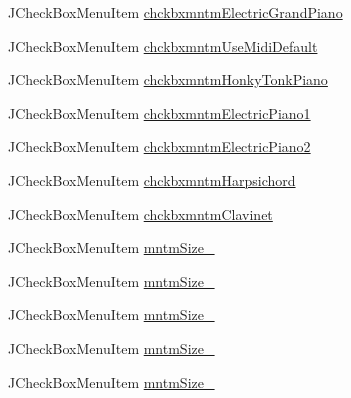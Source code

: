 \begin{DoxyCompactItemize}
\item 
J\+Check\+Box\+Menu\+Item \hyperlink{classcom_1_1lclion_1_1midigui_1_1_j_frame_m_i_d_i_piano_sheet_creator_ade34b598a3fb7ba9a61e9b2b7687ad9e}{chckbxmntm\+Electric\+Grand\+Piano}
\item 
J\+Check\+Box\+Menu\+Item \hyperlink{classcom_1_1lclion_1_1midigui_1_1_j_frame_m_i_d_i_piano_sheet_creator_ac9819205c38c3591401116984553387e}{chckbxmntm\+Use\+Midi\+Default}
\item 
J\+Check\+Box\+Menu\+Item \hyperlink{classcom_1_1lclion_1_1midigui_1_1_j_frame_m_i_d_i_piano_sheet_creator_ab59060cc1aaa1acf916f717203b8c8bd}{chckbxmntm\+Honky\+Tonk\+Piano}
\item 
J\+Check\+Box\+Menu\+Item \hyperlink{classcom_1_1lclion_1_1midigui_1_1_j_frame_m_i_d_i_piano_sheet_creator_a2a76124f85968992b142ad2d9fc78c73}{chckbxmntm\+Electric\+Piano1}
\item 
J\+Check\+Box\+Menu\+Item \hyperlink{classcom_1_1lclion_1_1midigui_1_1_j_frame_m_i_d_i_piano_sheet_creator_a64bf84906a571db4297425d89fd61dbd}{chckbxmntm\+Electric\+Piano2}
\item 
J\+Check\+Box\+Menu\+Item \hyperlink{classcom_1_1lclion_1_1midigui_1_1_j_frame_m_i_d_i_piano_sheet_creator_ad63305d8ca6fab38cf74a892d780461c}{chckbxmntm\+Harpsichord}
\item 
J\+Check\+Box\+Menu\+Item \hyperlink{classcom_1_1lclion_1_1midigui_1_1_j_frame_m_i_d_i_piano_sheet_creator_a1eba3e74979ed3e70114af6927e625a4}{chckbxmntm\+Clavinet}
\item 
J\+Check\+Box\+Menu\+Item \hyperlink{classcom_1_1lclion_1_1midigui_1_1_j_frame_m_i_d_i_piano_sheet_creator_ae16ca66c315ae28ba7b99aad21ad5e09}{mntm\+Size\+\_}
\item 
J\+Check\+Box\+Menu\+Item \hyperlink{classcom_1_1lclion_1_1midigui_1_1_j_frame_m_i_d_i_piano_sheet_creator_a3c49956bedee4fd23f4986f598da688c}{mntm\+Size\+\_}
\item 
J\+Check\+Box\+Menu\+Item \hyperlink{classcom_1_1lclion_1_1midigui_1_1_j_frame_m_i_d_i_piano_sheet_creator_ada6afb80750b1367cbb4dc4acae49f4b}{mntm\+Size\+\_}
\item 
J\+Check\+Box\+Menu\+Item \hyperlink{classcom_1_1lclion_1_1midigui_1_1_j_frame_m_i_d_i_piano_sheet_creator_afe11959823d15698b8ef79c701d24705}{mntm\+Size\+\_}
\item 
J\+Check\+Box\+Menu\+Item \hyperlink{classcom_1_1lclion_1_1midigui_1_1_j_frame_m_i_d_i_piano_sheet_creator_ad753490ecc6eb30372c7e8a4d9bce319}{mntm\+Size\+\_}
\item 

\end{DoxyCompactItemize}

